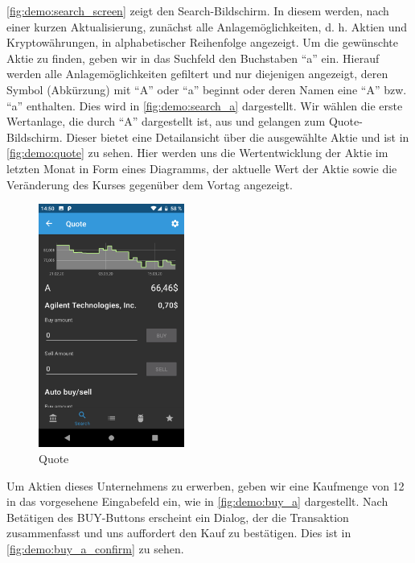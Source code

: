 \documentclass[a4paper]{article}
\begin{document}
\autoref{fig:demo:search_screen} zeigt den Search-Bildschirm. In diesem werden, nach einer kurzen Aktualisierung, zunächst alle Anlagemöglichkeiten, d. h. Aktien und Kryptowährungen, in alphabetischer Reihenfolge angezeigt. Um die gewünschte Aktie zu finden, geben wir in das Suchfeld den Buchstaben "`a"' ein. Hierauf werden alle Anlagemöglichkeiten gefiltert und nur diejenigen angezeigt, deren Symbol (Abkürzung) mit "`A"' oder "`a"' beginnt oder deren Namen eine "`A"' bzw. "`a"' enthalten. Dies wird in \autoref{fig:demo:search_a} dargestellt. Wir wählen die erste Wertanlage, die durch "`A"' dargestellt ist, aus und gelangen zum Quote-Bildschirm. Dieser bietet eine Detailansicht über die ausgewählte Aktie und ist in \autoref{fig:demo:quote} zu sehen. Hier werden uns die Wertentwicklung der Aktie im letzten Monat in Form eines Diagramms, der aktuelle Wert der Aktie sowie die Veränderung des Kurses gegenüber dem Vortag angezeigt.

\begin{figure}[H]
	\centering
	\includegraphics[height=8cm,keepaspectratio]{./images/demo/quote.png}
	\caption{Quote}
	\label{fig:demo:quote}
\end{figure}

Um Aktien dieses Unternehmens zu erwerben, geben wir eine Kaufmenge von 12 in das vorgesehene Eingabefeld ein, wie in \autoref{fig:demo:buy_a} dargestellt. Nach Betätigen des BUY-Buttons erscheint ein Dialog, der die Transaktion zusammenfasst und uns auffordert den Kauf zu bestätigen. Dies ist in \autoref{fig:demo:buy_a_confirm} zu sehen.
\end{document}
